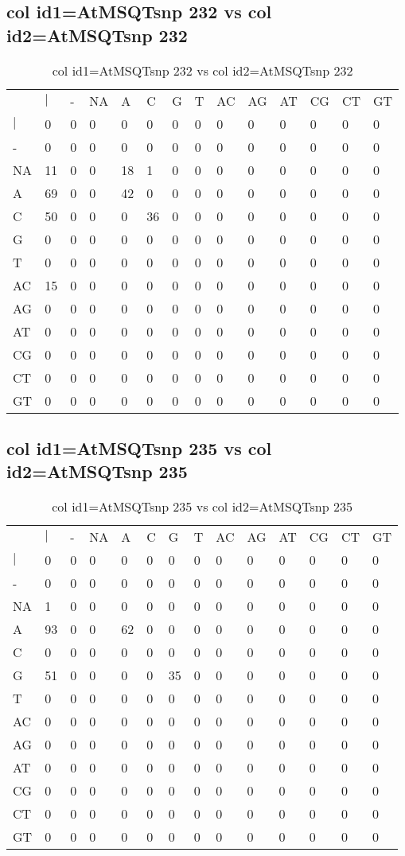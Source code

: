\subsection{col id1=AtMSQTsnp 232 vs col id2=AtMSQTsnp 232}
\begin{center}
\begin{longtable}{|l|l|l|l|l|l|l|l|l|l|l|l|l|l|}
\caption{col id1=AtMSQTsnp 232 vs col id2=AtMSQTsnp 232} \label{table_dm590}\\
\hline
\\
\hline
&$|$&-&NA&A&C&G&T&AC&AG&AT&CG&CT&GT\\
$|$&0&0&0&0&0&0&0&0&0&0&0&0&0\\
-&0&0&0&0&0&0&0&0&0&0&0&0&0\\
NA&11&0&0&18&1&0&0&0&0&0&0&0&0\\
A&69&0&0&42&0&0&0&0&0&0&0&0&0\\
C&50&0&0&0&36&0&0&0&0&0&0&0&0\\
G&0&0&0&0&0&0&0&0&0&0&0&0&0\\
T&0&0&0&0&0&0&0&0&0&0&0&0&0\\
AC&15&0&0&0&0&0&0&0&0&0&0&0&0\\
AG&0&0&0&0&0&0&0&0&0&0&0&0&0\\
AT&0&0&0&0&0&0&0&0&0&0&0&0&0\\
CG&0&0&0&0&0&0&0&0&0&0&0&0&0\\
CT&0&0&0&0&0&0&0&0&0&0&0&0&0\\
GT&0&0&0&0&0&0&0&0&0&0&0&0&0\\
\hline
\end{longtable}
\end{center}

\subsection{col id1=AtMSQTsnp 235 vs col id2=AtMSQTsnp 235}
\begin{center}
\begin{longtable}{|l|l|l|l|l|l|l|l|l|l|l|l|l|l|}
\caption{col id1=AtMSQTsnp 235 vs col id2=AtMSQTsnp 235} \label{table_dm592}\\
\hline
\\
\hline
&$|$&-&NA&A&C&G&T&AC&AG&AT&CG&CT&GT\\
$|$&0&0&0&0&0&0&0&0&0&0&0&0&0\\
-&0&0&0&0&0&0&0&0&0&0&0&0&0\\
NA&1&0&0&0&0&0&0&0&0&0&0&0&0\\
A&93&0&0&62&0&0&0&0&0&0&0&0&0\\
C&0&0&0&0&0&0&0&0&0&0&0&0&0\\
G&51&0&0&0&0&35&0&0&0&0&0&0&0\\
T&0&0&0&0&0&0&0&0&0&0&0&0&0\\
AC&0&0&0&0&0&0&0&0&0&0&0&0&0\\
AG&0&0&0&0&0&0&0&0&0&0&0&0&0\\
AT&0&0&0&0&0&0&0&0&0&0&0&0&0\\
CG&0&0&0&0&0&0&0&0&0&0&0&0&0\\
CT&0&0&0&0&0&0&0&0&0&0&0&0&0\\
GT&0&0&0&0&0&0&0&0&0&0&0&0&0\\
\hline
\end{longtable}
\end{center}

